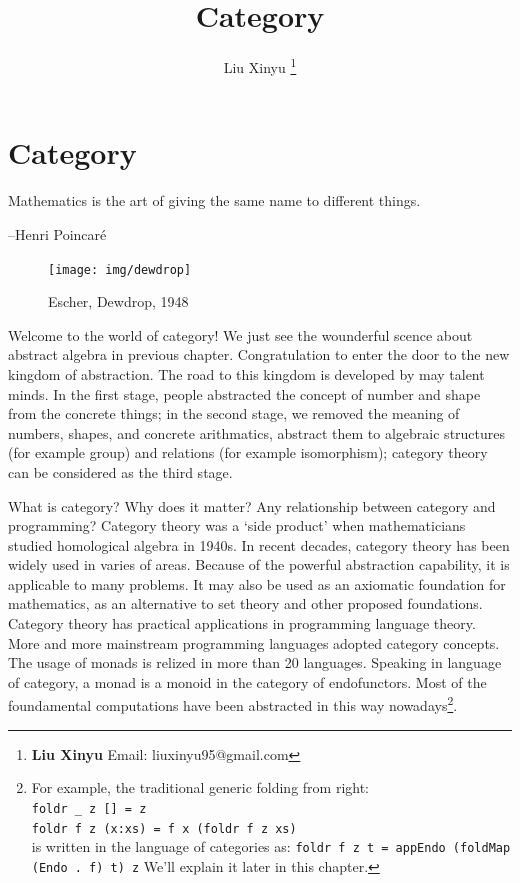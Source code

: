 \documentclass[b5paper]{article}
\begin{document}
\title{Category}

\author{Liu Xinyu
\thanks{{\bfseries Liu Xinyu} \newline
  Email: liuxinyu95@gmail.com \newline}
  }

\maketitle
\fi


\ifx\wholebook\relax
\chapter{Category}
\fi

\epigraph{Mathematics is the art of giving the same name to different things.}{--Henri Poincaré}


\begin{figure}
 \centering
 \texttt{[image: img/dewdrop]}
 \captionsetup{labelformat=empty}
 \caption{Escher, Dewdrop, 1948}
 \label{fig:Escher-Dewdrop-1948}
\end{figure}

Welcome to the world of category! We just see the wounderful scence about abstract algebra in previous chapter. Congratulation to enter the door to the new kingdom of abstraction. The road to this kingdom is developed by may talent minds. In the first stage, people abstracted the concept of number and shape from the concrete things; in the second stage, we removed the meaning of numbers, shapes, and concrete arithmatics, abstract them to algebraic structures (for example group) and relations (for example isomorphism); category theory can be considered as the third stage.

What is category? Why does it matter? Any relationship between category and programming? Category theory was a `side product' when mathematicians studied homological algebra in 1940s. In recent decades, category theory has been widely used in varies of areas. Because of the powerful abstraction capability, it is applicable to many problems. It may also be used as an axiomatic foundation for mathematics, as an alternative to set theory and other proposed foundations. Category theory has practical applications in programming language theory. More and more mainstream programming languages adopted category concepts. The usage of monads is relized in more than 20 languages\cite{Monad-Haskell-Wiki}. Speaking in language of category, a monad is a monoid in the category of endofunctors. Most of the foundamental computations have been abstracted in this way nowadays\footnote{For example, the traditional generic folding from right: \\
\lstinline{foldr _ z [] = z} \\
\lstinline{foldr f z (x:xs) = f x (foldr f z xs)} \\
is written in the language of categories as: \lstinline{foldr f z t = appEndo (foldMap (Endo . f) t) z} We'll explain it later in this chapter.}.
\end{document}
